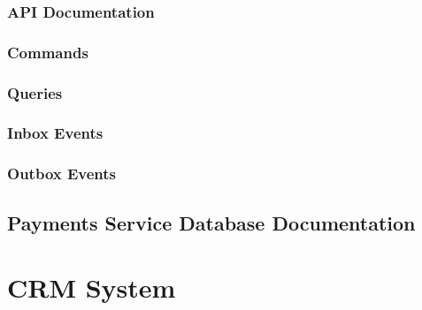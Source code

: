 \documentclass[letterpaper,10pt,english]{sphinxmanual}
\begin{document}
\subsection{API Documentation}
\label{\detokenize{administration_concession_system/orders_service:api-documentation}}

\subsection{Commands}
\label{\detokenize{administration_concession_system/orders_service:commands}}

\subsection{Queries}
\label{\detokenize{administration_concession_system/orders_service:queries}}

\subsection{Inbox Events}
\label{\detokenize{administration_concession_system/orders_service:inbox-events}}

\subsection{Outbox Events}
\label{\detokenize{administration_concession_system/orders_service:outbox-events}}

\section{Payments Service Database Documentation}
\label{\detokenize{administration_concession_system/orders_service:payments-service-database-documentation}}
\sphinxstepscope


\chapter{CRM System}
\label{\detokenize{crm_system/index:crm-system}}\label{\detokenize{crm_system/index::doc}}


\renewcommand{\indexname}{Index}
\printindex
\end{document}
